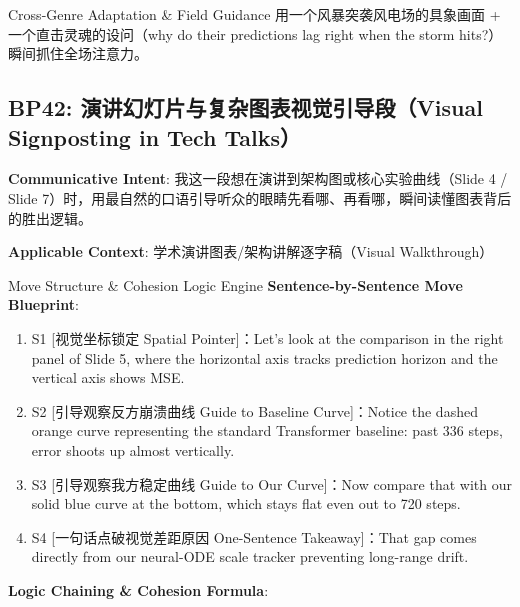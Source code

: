 \endgroup
\vspace{4pt}
\begin{TipBox}{Cross-Genre Adaptation \& Field Guidance}
用一个风暴突袭风电场的具象画面 + 一个直击灵魂的设问（why do their predictions lag right when the storm hits?）瞬间抓住全场注意力。
\end{TipBox}
\vspace{8pt}
\subsection{BP42: 演讲幻灯片与复杂图表视觉引导段（Visual Signposting in Tech Talks）}\label{sec:bp:BP42}
\noindent\textbf{\color{AcadNavy}Communicative Intent}: 我这一段想在演讲到架构图或核心实验曲线（Slide 4 / Slide 7）时，用最自然的口语引导听众的眼睛先看哪、再看哪，瞬间读懂图表背后的胜出逻辑。\par\vspace{2pt}
\noindent\textbf{\color{AcadSlate}Applicable Context}: 学术演讲图表/架构讲解逐字稿（Visual Walkthrough）\par\vspace{4pt}
\begin{ConceptBox}{Move Structure \& Cohesion Logic Engine}
\textbf{Sentence-by-Sentence Move Blueprint}:
\begin{enumerate}[label=\textbf{\color{AcadNavy}S\arabic*.}, leftmargin=2em, itemsep=2pt]
  \item S1 [视觉坐标锁定 Spatial Pointer]：Let's look at the comparison in the right panel of Slide 5, where the horizontal axis tracks prediction horizon and the vertical axis shows MSE.
  \item S2 [引导观察反方崩溃曲线 Guide to Baseline Curve]：Notice the dashed orange curve representing the standard Transformer baseline: past 336 steps, error shoots up almost vertically.
  \item S3 [引导观察我方稳定曲线 Guide to Our Curve]：Now compare that with our solid blue curve at the bottom, which stays flat even out to 720 steps.
  \item S4 [一句话点破视觉差距原因 One-Sentence Takeaway]：That gap comes directly from our neural-ODE scale tracker preventing long-range drift.
\end{enumerate}\par\vspace{4pt}
\textbf{Logic Chaining \& Cohesion Formula}:\par{}
\end{ConceptBox}
